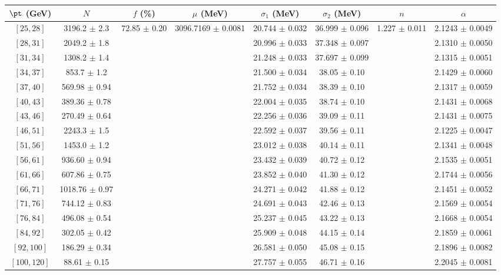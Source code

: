 \begin{tabular}{c||c|c|c|c|c|c|c}
$\pt$ (GeV) & $N$ & $f$ (\%) & $\mu$ (MeV) & $\sigma_1$ (MeV) & $\sigma_2$ (MeV) & $n$ & $\alpha$ \\
\hline
$[25, 28]$ & 3196.2 $\pm$ 2.3 & \multirow{17}{*}{72.85 $\pm$ 0.20} & \multirow{17}{*}{3096.7169 $\pm$ 0.0081} & 20.744 $\pm$ 0.032 & 36.999 $\pm$ 0.096 & \multirow{17}{*}{1.227 $\pm$ 0.011} & 2.1243 $\pm$ 0.0049\\
$[28, 31]$ & 2049.2 $\pm$ 1.8 &  &  & 20.996 $\pm$ 0.033 & 37.348 $\pm$ 0.097 &  & 2.1310 $\pm$ 0.0050\\
$[31, 34]$ & 1308.2 $\pm$ 1.4 &  &  & 21.248 $\pm$ 0.033 & 37.697 $\pm$ 0.099 &  & 2.1315 $\pm$ 0.0051\\
$[34, 37]$ & 853.7 $\pm$ 1.2 &  &  & 21.500 $\pm$ 0.034 & 38.05 $\pm$ 0.10 &  & 2.1429 $\pm$ 0.0060\\
$[37, 40]$ & 569.98 $\pm$ 0.94 &  &  & 21.752 $\pm$ 0.034 & 38.39 $\pm$ 0.10 &  & 2.1317 $\pm$ 0.0059\\
$[40, 43]$ & 389.36 $\pm$ 0.78 &  &  & 22.004 $\pm$ 0.035 & 38.74 $\pm$ 0.10 &  & 2.1431 $\pm$ 0.0068\\
$[43, 46]$ & 270.49 $\pm$ 0.64 &  &  & 22.256 $\pm$ 0.036 & 39.09 $\pm$ 0.11 &  & 2.1431 $\pm$ 0.0075\\
$[46, 51]$ & 2243.3 $\pm$ 1.5 &  &  & 22.592 $\pm$ 0.037 & 39.56 $\pm$ 0.11 &  & 2.1225 $\pm$ 0.0047\\
$[51, 56]$ & 1453.0 $\pm$ 1.2 &  &  & 23.012 $\pm$ 0.038 & 40.14 $\pm$ 0.11 &  & 2.1341 $\pm$ 0.0048\\
$[56, 61]$ & 936.60 $\pm$ 0.94 &  &  & 23.432 $\pm$ 0.039 & 40.72 $\pm$ 0.12 &  & 2.1535 $\pm$ 0.0051\\
$[61, 66]$ & 607.86 $\pm$ 0.75 &  &  & 23.852 $\pm$ 0.040 & 41.30 $\pm$ 0.12 &  & 2.1744 $\pm$ 0.0056\\
$[66, 71]$ & 1018.76 $\pm$ 0.97 &  &  & 24.271 $\pm$ 0.042 & 41.88 $\pm$ 0.12 &  & 2.1451 $\pm$ 0.0052\\
$[71, 76]$ & 744.12 $\pm$ 0.83 &  &  & 24.691 $\pm$ 0.043 & 42.46 $\pm$ 0.13 &  & 2.1569 $\pm$ 0.0054\\
$[76, 84]$ & 496.08 $\pm$ 0.54 &  &  & 25.237 $\pm$ 0.045 & 43.22 $\pm$ 0.13 &  & 2.1668 $\pm$ 0.0054\\
$[84, 92]$ & 302.05 $\pm$ 0.42 &  &  & 25.909 $\pm$ 0.048 & 44.15 $\pm$ 0.14 &  & 2.1859 $\pm$ 0.0061\\
$[92, 100]$ & 186.29 $\pm$ 0.34 &  &  & 26.581 $\pm$ 0.050 & 45.08 $\pm$ 0.15 &  & 2.1896 $\pm$ 0.0082\\
$[100, 120]$ & 88.61 $\pm$ 0.15 &  &  & 27.757 $\pm$ 0.055 & 46.71 $\pm$ 0.16 &  & 2.2045 $\pm$ 0.0081\\
\end{tabular}
